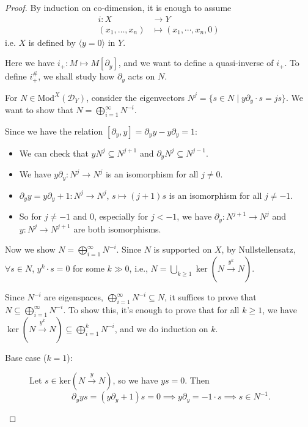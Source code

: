 \begin{proof}
    By induction on co-dimension, it is enough to assume
    \[
        \begin{aligned}
            i: X                & \longrightarrow Y                  \\
            (x_{1},\dots,x_{n}) & \longmapsto (x_{1},\cdots,x_{n},0)
        \end{aligned}
    \]
    i.e. $X$ is defined by $\langle y = 0 \rangle$ in $Y$.

    Here we have $i_{+}: M\mapsto M[\partial_{y}]$, and we want to define a quasi-inverse of $i_{+}$. To define $i_{+}^{\#}$, we shall study how $\partial_{y}$ acts on $N$.

    For $N \in \mathrm{Mod}^{X}(\mathcal{D}_{Y})$, consider the eigenvectors $N^{j} = \{ s \in N \mid y\partial_{y} \cdot s = j s \}$. We want to show that $N=\bigoplus\limits_{i=1}^{\infty}N^{-i}$.

    Since we have the relation $[\partial_{y}, y] = \partial_{y}y -  y\partial_{y} = 1$:
    \begin{itemize}
        \item We can check that $y N^{j} \subseteq N^{j+1}$ and $\partial_{y} N^{j} \subseteq N^{j-1}$.
        \item We have $y\partial_{y}: N^{j}\rightarrow N^{j}$ is an isomorphism for all $j \neq 0$.
        \item $\partial_{y}y = y\partial_{y} + 1: N^{j}\rightarrow N^{j}$, $s\mapsto (j+1)s$ is an isomorphism for all $j \neq -1$.
        \item So for $j\neq -1$ and $0$, especially for $j<-1$, we have $\partial_{y}:N^{j+1}\rightarrow N^{j}$ and $y:N^{j}\rightarrow N^{j+1}$ are both isomorphisms.
    \end{itemize}

    Now we show $N=\bigoplus\limits_{i=1}^{\infty}N^{-i}$.
    Since $N$ is supported on $X$, by Nullstellensatz, $\forall s\in N$, $y^{k}\cdot s = 0$ for some $k\gg0$, i.e., $N = \bigcup\limits_{k\geq1} \ker(N\xrightarrow{y^{k}} N)$.

    Since $N^{-i}$ are eigenspaces, $\bigoplus\limits_{i=1}^{\infty }N^{-i}\subseteq N$, it suffices to prove that $N\subseteq \bigoplus\limits_{i=1}^{\infty }N^{-i}$. To show this, it's enough to prove that for all $k\ge 1$, we have $\ker(N\xrightarrow{y^{k}} N)\subseteq\bigoplus\limits_{i=1}^{k}N^{-i}$, and we do induction on $k$.

    \begin{description}
        \item[Base case ($k=1$):] Let $s\in \mathrm{ker}(N\xrightarrow{y}N)$, so we have $ys=0$. Then
            \[
                \partial_{y}ys=(y\partial_{y}+1)s=0 \implies y\partial_{y}=-1\cdot s \implies s\in N^{-1}.
            \]


\end{description}
\end{proof}
